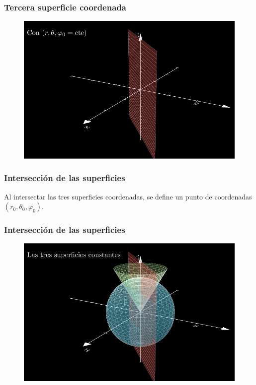 \documentclass[12pt]{beamer}
\begin{document}
{ %
\begin{frame}
\frametitle{Tercera superficie coordenada}
\begin{figure}
   \centering
   \includegraphics[width=0.95\linewidth]{Imagenes/superficies_esfericas_03.png}
   \label{fig:superficies_esfericas_03}
\end{figure}
\end{frame}
}
\begin{frame}
\frametitle{Intersección de las superficies}
Al intersectar las tres superficies coordenadas, se define un punto de coordenadas $(r_{0}, \theta_{0}, \varphi_{0})$.
\end{frame}
{ %
\begin{frame}
\frametitle{Intersección de las superficies}
\begin{figure}
   \centering
   \includegraphics[width=0.95\linewidth]{Imagenes/superficies_esfericas_04.png}
   \label{fig:superficies_esfericas_04}
\end{figure}
\end{frame}
}
\end{document}

